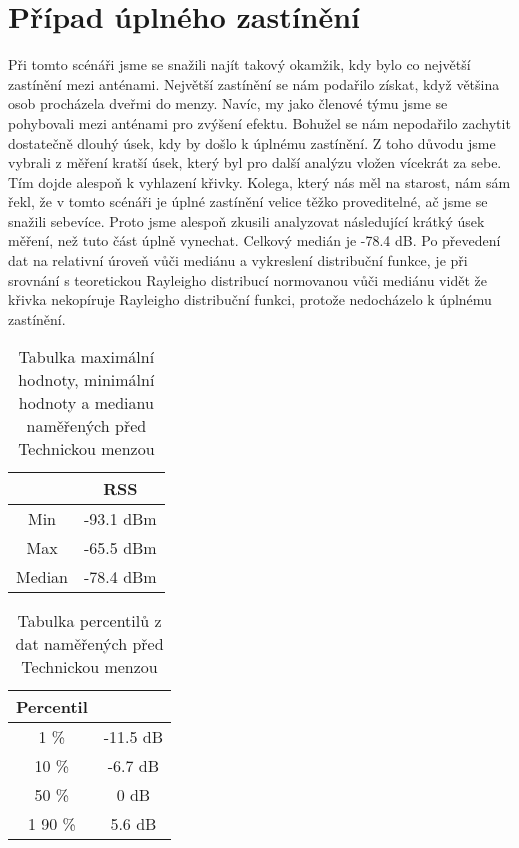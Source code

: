 \section{Případ úplného zastínění}
Při tomto scénáři jsme se snažili najít takový okamžik, kdy bylo co největší zastínění mezi anténami. Největší zastínění se nám podařilo získat, když většina osob procházela dveřmi do menzy. Navíc, my jako členové týmu jsme se pohybovali mezi anténami pro zvýšení efektu. Bohužel se nám nepodařilo zachytit dostatečně dlouhý úsek, kdy by došlo k úplnému zastínění. Z toho důvodu jsme vybrali z měření kratší úsek, který byl pro další analýzu vložen vícekrát za sebe. Tím dojde alespoň k vyhlazení křivky. Kolega, který nás měl na starost, nám sám řekl, že v tomto scénáři je úplné zastínění velice těžko proveditelné, ač jsme se snažili sebevíce. Proto jsme alespoň zkusili analyzovat následující krátký úsek měření, než tuto část úplně vynechat. 
Celkový medián je -78.4 dB. Po převedení dat na relativní úroveň vůči mediánu a vykreslení distribuční funkce, je při srovnání s teoretickou Rayleigho distribucí normovanou vůči mediánu vidět že křivka nekopíruje Rayleigho distribuční funkci, protože nedocházelo k úplnému zastínění.

\begin{table}[h!]
\centering
\begin{tabular}{|c|c|}
  \hline
   & RSS \\
  \hline
  Min & -93.1 dBm\\
  \hline
  Max & -65.5 dBm\\
  \hline
  Median & -78.4 dBm \\
  \hline
\end{tabular}
\caption{Tabulka maximální hodnoty, minimální hodnoty a medianu naměřených před Technickou menzou}
\end{table}



\begin{table}[h!]
\centering
\begin{tabular}{|c|c|}
  \hline
   Percentil &  \\
  \hline
  1 \% & -11.5 dB\\
  \hline
  10 \% & -6.7 dB\\
  \hline
  50 \% & 0 dB \\
  \hline1 
  90 \% & 5.6 dB \\
  \hline
\end{tabular}
\caption{Tabulka percentilů z dat naměřených před Technickou menzou}
\end{table}

